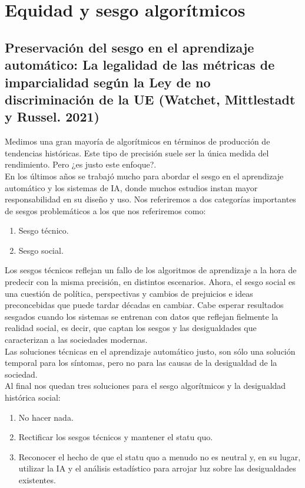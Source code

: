 \chapter{Equidad y sesgo algorítmicos}

\section{Preservación del sesgo en el aprendizaje automático: La legalidad de las métricas de imparcialidad según la Ley de no discriminación de la UE (Watchet, Mittlestadt y Russel. 2021)}
Medimos una gran mayoría de algorítmicos en términos de producción de tendencias históricas. Este tipo de precisión suele ser la única medida del rendimiento. Pero ¿es justo este enfoque?. \\

En los últimos años se trabajó mucho para abordar el sesgo en el aprendizaje automático y los sistemas de IA, donde muchos estudios instan mayor responsabilidad en su diseño y uso. Nos referiremos a dos categorías importantes de sesgos problemáticos a los que nos referiremos como:

\begin{enumerate}[1.]
    \item Sesgo técnico.
    \item Sesgo social.
\end{enumerate}

Los sesgos técnicos reflejan un fallo de los algoritmos de aprendizaje a la hora de predecir con la misma precisión, en distintos escenarios. Ahora, el sesgo social es una cuestión de política, perspectivas y cambios de prejuicios e ideas preconcebidas que puede tardar décadas en cambiar. Cabe esperar resultados sesgados cuando los sistemas se entrenan con datos que reflejan fielmente la realidad social, es decir, que captan los sesgos y las desigualdades que caracterizan a las sociedades modernas. \\

Las soluciones técnicas en el aprendizaje automático justo, son sólo una solución temporal para los síntomas, pero no para las causas de la desigualdad de la sociedad.\\

Al final nos quedan tres soluciones para el sesgo algorítmicos y la desigualdad histórica social:

\begin{enumerate}[1.]	
    \item No hacer nada.
    \item Rectificar los sesgos técnicos y mantener el statu quo.
    \item Reconocer el hecho de que el statu quo a menudo no es neutral y, en su lugar, utilizar la IA y el análisis estadístico para arrojar luz sobre las desigualdades existentes.
\end{enumerate}

